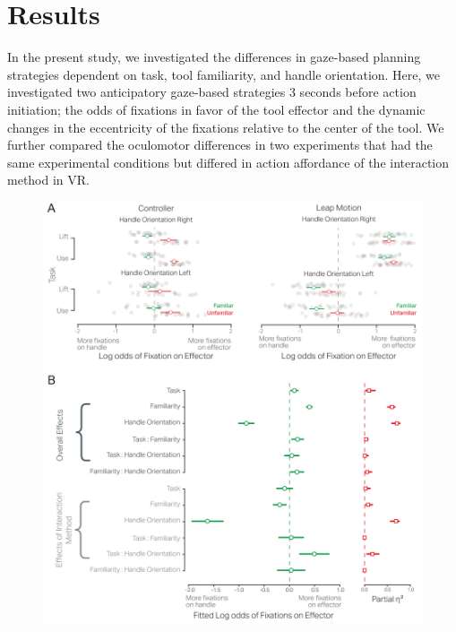 \section{Results}

In the present study, we investigated the differences in gaze-based planning strategies dependent on task, tool familiarity, and handle orientation. Here, we investigated two anticipatory gaze-based strategies 3 seconds before action initiation; the odds of fixations in favor of the tool effector and the dynamic changes in the eccentricity of the fixations relative to the center of the tool. We further compared the oculomotor differences in two experiments that had the same experimental conditions but differed in action affordance of the interaction method in VR. 


\begin{figure}[ht]
    \centering
    \includegraphics[width=0.85\linewidth]{source/figures/result/full_model_cdata_coefs.png} \\

\end{figure}
